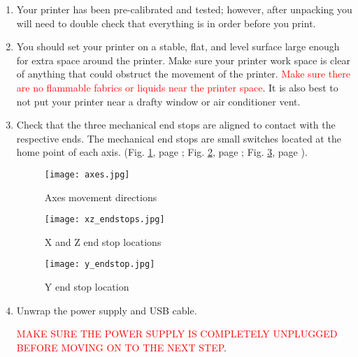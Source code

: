 \begin{enumerate}
\item Your printer has been pre-calibrated and tested; however, after unpacking you will need to double check that everything is in order before you print.

\item You should set your printer on a stable, flat, and level surface large enough for extra space around the printer. Make sure your printer work space is clear of anything that could obstruct the movement of the printer. \textcolor{red}{Make sure there are no flammable fabrics or liquids near the printer space}. It is also best to not put your printer near a drafty window or air conditioner vent.

\item Check that the three mechanical end stops are aligned to contact with the respective ends. The mechanical end stops are small switches located at the home point of each axis.
(Fig. \ref{fig:axes}, page \pageref{fig:axes}; Fig. \ref{fig:xz_endstops}, page \pageref{fig:xz_endstops}; Fig. \ref{fig:y_endstop}, page \pageref{fig:y_endstop}).
\begin{figure}[hp]
\centering
\texttt{[image: axes.jpg]}
\caption{Axes movement directions}
\label{fig:axes}
\end{figure}
\begin{figure}[hp]
\centering
\texttt{[image: xz\_endstops.jpg]}
\caption{X and Z end stop locations}
\label{fig:xz_endstops}
\end{figure}
\begin{figure}[hp]
\centering
\texttt{[image: y\_endstop.jpg]}
\caption{Y end stop location}
\label{fig:y_endstop}
\end{figure}

\item Unwrap the power supply and USB cable.

\textcolor{red}{MAKE SURE THE POWER SUPPLY IS COMPLETELY UNPLUGGED BEFORE MOVING ON TO THE NEXT STEP}.


\end{enumerate}
